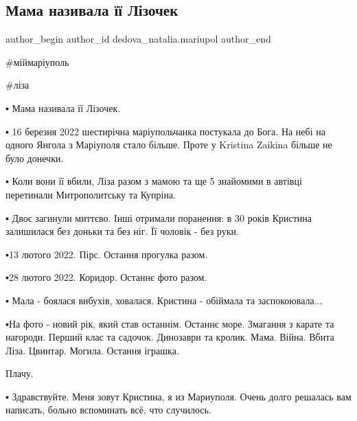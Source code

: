  
 
 
 
 

\subsection{Мама називала її Лізочек}
\label{sec:20_02_2023.fb.dedova_natalia.mariupol.1.mama_nazivala___l_z}

\ifcmt
 author_begin
   author_id dedova_natalia.mariupol
 author_end
\fi

\#міймаріуполь

\#ліза

▪️ Мама називала її Лізочек.

▪️ 16 березня 2022 шестирічна маріупольчанка постукала до Бога. На небі на
одного Янгола з Маріуполя стало більше. Проте у Kristina Zaikina більше не було
донечки.

▪️ Коли вони її вбили, Ліза разом з мамою та ще 5 знайомими в автівці перетинали
Митрополитську та Купріна. 

▪️ Двоє загинули миттєво. Інші отримали поранення: в 30 років Кристина
залишилася без доньки та без ніг. Її чоловік - без руки. 

▪️13 лютого 2022. Пірс. Остання прогулка разом. 

▪️28 лютого 2022. Коридор. Останнє фото разом. 

▪️ Мала - боялася вибухів, ховалася. Кристина - обіймала та заспокоювала... 

▪️На фото - новий рік, який став останнім. Останнє море. Змагання з карате та
нагороди. Перший клас та садочок. Динозаври та кролик. Мама. Війна. Вбита Ліза.
Цвинтар. Могила. Остання іграшка. 

Плачу. 

▪️ Здравствуйте. Меня зовут Кристина, я из Мариуполя. Очень долго решалась вам
написать, больно вспоминать всё, что случилось. 


